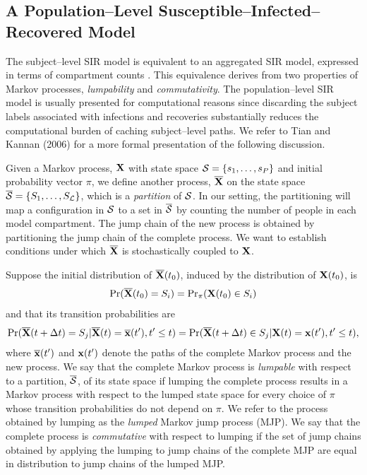 \subsection{A Population--Level Susceptible--Infected--Recovered Model}
\label{subsec:sir_population_mod}
The subject--level SIR model is equivalent to an aggregated SIR model, expressed in terms of compartment counts \cite{allen2008introduction, andersson2000stochastic}. This equivalence derives from two properties of Markov processes, \textit{lumpability} and \textit{commutativity}. The population--level SIR model is usually presented for computational reasons since discarding the subject labels associated with infections and recoveries substantially reduces the computational burden of caching subject--level paths. We refer to Tian and Kannan (2006) \nocite{tian2006lumpability} for a more formal presentation of the following discussion. 

Given a Markov process, $ \mathbf{X} $ with state space $ \mathcal{S} = \lbrace s_1,\dots,s_P\rbrace $ and initial probability vector $ \pi $, we define another process, $ \overline{\mathbf{X}} $ on the state space $ \overline{\mathcal{S}} = \lbrace S_1,\dots,S_\mathcal{L}\rbrace $, which is a \textit{partition} of $ \mathcal{S} $. In our setting, the partitioning will map a configuration in $ \mathcal{S} $ to a set in $ \overline{\mathcal{S}} $ by counting the number of people in each model compartment. The jump chain of the new process is obtained by partitioning the jump chain of the complete process. We want to establish conditions under which $ \overline{\mathbf{X}} $ is stochastically coupled to $ \mathbf{X} $. 

Suppose the initial distribution of $ \overline{\mathbf{X}}(t_0) $, induced by the distribution of $ \mathbf{X}(t_0) $, is \begin{equation*}
\Pr(\overline{\mathbf{X}}(t_0) = S_i) = \mathrm{Pr}_\pi(\mathbf{X}(t_0) \in S_i)
\end{equation*}
and that its transition probabilities are
\begin{equation*}
\Pr(\overline{\mathbf{X}}(t+\Delta t) = S_j | \overline{\mathbf{X}}(t)=\overline{\mathbf{x}}(t^\prime), t^\prime \leq t) = \Pr(\overline{\mathbf{X}}(t+\Delta t) \in S_j | \mathbf{X}(t)=\mathbf{x}(t^\prime), t^\prime \leq t),
\end{equation*}
where $ \overline{\mathbf{x}}(t^\prime) $  and $ \mathbf{x}(t^\prime) $ denote the paths of the complete Markov process and the new process. We say that the complete Markov process is \textit{lumpable} with respect to a partition, $ \overline{\mathcal{S}} $, of its state space if lumping the complete process results in a Markov process with respect to the lumped state space for every choice of $ \pi $ whose transition probabilities do not depend on $ \pi $. We refer to the process obtained by lumping as the \textit{lumped} Markov jump process (MJP). We say that the complete process is \textit{commutative} with respect to lumping if the set of jump chains obtained by applying the lumping to jump chains of the complete MJP are equal in distribution to jump chains of the lumped MJP.

